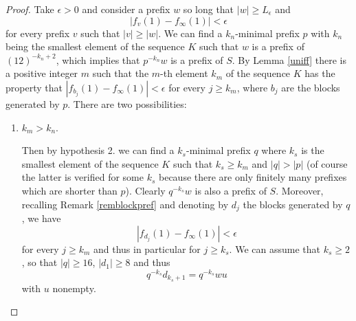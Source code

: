 \documentclass[10pt,a4paper]{article}
\begin{document}
\begin{proof}

Take $\epsilon>0$ and consider a prefix $w$ so long that $|w|\ge L_\epsilon$ and \begin{equation}
|f_v(1)-f_{\infty}(1)|<\epsilon
\label{preff}
\end{equation} 
for every prefix $v$ such that $|v|\ge|w|$. 
We can find a $k_n$-minimal prefix $p$ with $k_n$ being the smallest element of the sequence $K$ such that $w$ is a prefix of $(12)^{-k_n+2}$, which implies that $p^{-k_n}w$ is a prefix of $S$. By Lemma \ref{uniff} there is a positive integer $m$ such that the $m$-th element $k_m$ of the sequence $K$ has the property that $|f_{b_j}(1)-f_{\infty}(1)|<\epsilon$ for every $j\ge k_m$, where $b_j$ are the blocks generated by $p$. There are two possibilities:
\begin{enumerate}
\item $k_m>k_n$.

 Then by hypothesis 2. we can find a $k_s$-minimal prefix $q$ where $k_s$ is the smallest element of the sequence $K$ such that $k_s\ge k_m$ and $|q|>|p|$ (of course the latter is verified for some $k_s$ because there are only finitely many prefixes which are shorter than $p$). Clearly $q^{-k_s}w$
is also a prefix of $S$. Moreover, recalling Remark \ref{remblockpref} and denoting by $d_j$ the blocks generated by $q$, we have 
\begin{equation}|f_{d_j}(1)-f_{\infty}(1)|<\epsilon 
\label{d_k}
\end{equation}
for every $j\ge k_m$ and thus in particular for $j\ge k_s$. We can assume that $k_s\ge 2$, so that $|q|\ge 16$, $|d_1|\ge 8$ and thus 
\begin{equation}
q^{-k_s}d_{k_s+1}=q^{-k_s}wu
\label{eqx}
\end{equation}
with $u$ nonempty.


\end{enumerate}
\end{proof}
\end{document}
